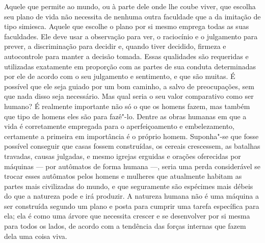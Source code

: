  Aquele que permite ao mundo, ou à parte dele onde lhe coube viver, que
escolha seu plano de vida não necessita de nenhuma outra faculdade que
a da imitação de tipo simiesca. Aquele que escolhe o plano por si mesmo
emprega todas as suas faculdades. Ele deve usar a observação para ver,
o raciocínio e o julgamento para prever, a discriminação para decidir
e, quando tiver decidido, firmeza e autocontrole para manter a decisão
tomada. Essas qualidades são requeridas e utilizadas exatamente em
proporção com as partes de sua conduta determinadas por ele de acordo com o
seu julgamento e sentimento, e que são muitas. É possível que ele seja
guiado por um bom caminho, a salvo de preocupações, sem que nada disso
seja necessário. Mas qual seria o seu valor comparativo como ser humano?
É realmente importante não só o que os homens fazem, mas também que
tipo de homens eles são para fazê"-lo. Dentre as obras humanas em que a
vida é corretamente empregada para o aperfeiçoamento e embelezamento, certamente
a primeira em importância é o próprio homem. Suponha"-se que fosse
possível conseguir que casas fossem construídas, os cereais crescessem,
as batalhas travadas, causas julgadas, e mesmo igrejas erguidas e
orações oferecidas por máquinas --- por autômatos de forma humana ---, seria
uma perda considerável se trocar esses autômatos pelos homens e
mulheres que atualmente habitam as partes mais civilizadas do mundo, e
que seguramente são espécimes mais débeis do que a natureza pode e irá
produzir. A natureza humana não é uma máquina a ser construída segundo
um plano e posta para cumprir uma tarefa específica para ela; ela é
como uma árvore que necessita crescer e se desenvolver por si mesma
para todos os lados, de acordo com a tendência das forças internas que
fazem dela uma coisa viva.

